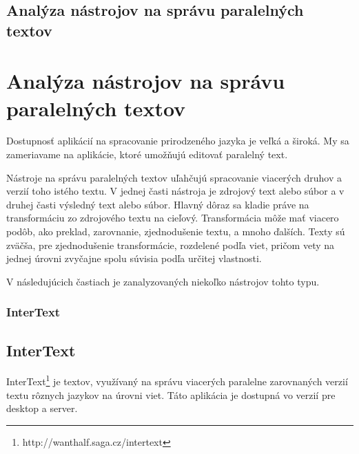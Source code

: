 \newpage
%
%
{
	\section{Analýza nástrojov na správu paralelných textov} 
}
{
	\chapter{Analýza nástrojov na správu paralelných textov}
}
\label{analysis2}
Dostupnosť aplikácií na spracovanie prirodzeného jazyka je veľká a široká. My sa zameriavame na aplikácie, ktoré umožňujú editovať paralelný text.

Nástroje na správu paralelných textov uľahčujú spracovanie viacerých druhov a verzií toho istého textu. V jednej časti nástroja je zdrojový text alebo súbor a v druhej časti výsledný text alebo súbor. Hlavný dôraz sa kladie práve na transformáciu zo zdrojového textu na cieľový. Transformácia môže mať viacero podôb, ako preklad, zarovnanie, zjednodušenie textu, a mnoho ďalších. Texty sú zväčša, pre zjednodušenie transformácie, rozdelené podľa viet, pričom vety na jednej úrovni zvyčajne spolu súvisia podľa určitej vlastnosti.

V následujúcich častiach je zanalyzovaných niekoľko nástrojov tohto typu.

%
%
{
	\subsection{InterText}
}
{
	\section{InterText}
}
InterText\footnote{http://wanthalf.saga.cz/intertext} je textov, využívaný na správu viacerých paralelne zarovnaných verzií textu rôznych jazykov na úrovni viet. Táto aplikácia je dostupná vo verzií pre desktop a server.

